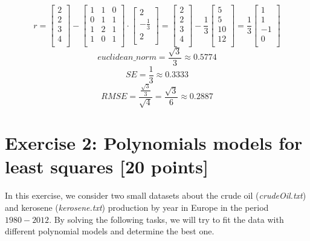 \documentclass[unicode,11pt,a4paper,oneside,numbers=endperiod,openany]{scrartcl}
\begin{document}
\[
    r
    =
    \begin{bmatrix} 2 \\ 2 \\ 3 \\ 4 \\ \end{bmatrix}
    -
    \begin{bmatrix} 1 & 1 & 0 \\0 & 1 & 1 \\1 & 2 & 1 \\1 & 0 & 1 \\ \end{bmatrix}
    \cdot
    \begin{bmatrix} 2 \\ - \frac{1}{3} \\ 2 \\ \end{bmatrix}
    =
    \begin{bmatrix} 2 \\ 2 \\ 3 \\ 4 \\ \end{bmatrix}
    -
    \frac{1}{3} \begin{bmatrix} 5 \\ 5 \\ 10 \\ 12 \\ \end{bmatrix}
    =
    \frac{1}{3} \begin{bmatrix} 1 \\ 1 \\ -1 \\ 0 \\ \end{bmatrix}
\]
\[
    euclidean\_norm
    = \frac{\sqrt{3}}{3}
    \approx 0.5774
\]
\[
    SE
    = \frac{1}{3}
    \approx 0.3333
\]
\[
    RMSE
    = \frac{\frac{\sqrt{3}}{3}}{\sqrt{4}}
    = \frac{\sqrt{3}}{6}
    \approx 0.2887
\]


\section*{Exercise 2: Polynomials models for least squares [20 points]}

In this exercise, we consider two small datasets about the crude oil (\textit{crudeOil.txt})
and kerosene (\textit{kerosene.txt}) production by year in Europe in the period $1980-2012$.
By solving the following tasks, we will try to fit the data with different polynomial models
and determine the best one.\\
\end{document}
